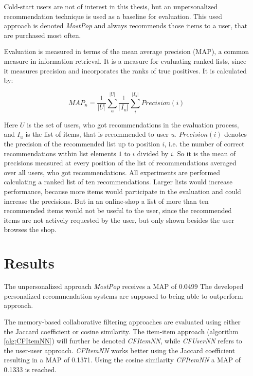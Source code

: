 \documentclass[10pt]{reportMaster}
\begin{document}
Cold-start users are not of interest in this thesis, but an unpersonalized recommendation technique is used as a baseline for evaluation.
This used approach is denoted \textit{MostPop} and always recommends those items to a user, that are purchased most often.

Evaluation is measured in terms of the mean average precision (MAP), a common measure in information retrieval.
It is a measure for evaluating ranked lists, since it measures precision and incorporates the ranks of true positives.
It is calculated by:

\begin{equation}
	MAP_n = \frac{1}{|U|} \sum_u^{|U|} \frac{1}{|I_u|}\sum_i^{|I_u|} Precision(i)
\end{equation}

Here $U$ is the set of users, who got recommendations in the evaluation process, and $I_u$ is the list of items, that is recommended to user $u$.
$Precision(i)$ denotes the precision of the recommended list up to position $i$, i.e. the number of correct recommendations within list elements $1$ to $i$ divided by $i$.
So it is the mean of precisions measured at every position of the list of recommendations averaged over all users, who got recommendations.
All experiments are performed calculating a ranked list of ten recommendations.
Larger lists would increase performance, because more items would participate in the evaluation and could increase the precisions.
But in an online-shop a list of more than ten recommended items would not be useful to the user, since the recommended items are not actively requested by the user, but only shown besides the user browses the shop. 


\section{Results}
\label{sec:results}
The unpersonalized approach \textit{MostPop} receives a MAP of 0.0499
The developed personalized recommendation systems are supposed to being able to outperform approach.

The memory-based collaborative filtering approaches are evaluated using either the Jaccard coefficient or cosine similarity.
The item-item approach (algorithm \ref{alg:CFItemNN}) will further be denoted \textit{CFItemNN}, while \textit{CFUserNN} refers to the user-user approach.
\textit{CFItemNN} works better using the Jaccard coefficient resulting in a MAP of 0.1371.
Using the cosine similarity \textit{CFItemNN} a MAP of 0.1333 is reached.
\end{document}
